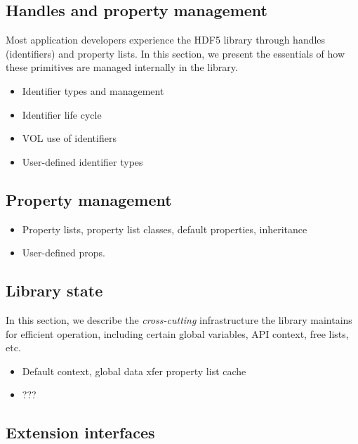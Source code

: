 \subsection{Handles and property management}\label{sec:handles}

Most application developers experience the HDF5 library through handles (identifiers) and property lists. In this section, we present the essentials of how these primitives are managed internally in the library.

\begin{itemize}
    \item Identifier types and management
    \item Identifier life cycle
    \item VOL use of identifiers
    \item User-defined identifier types
\end{itemize}

\subsection{Property management}\label{sec:properties}

\begin{itemize}
    \item Property lists, property list classes, default properties, inheritance
    \item User-defined props.
\end{itemize}


\subsection{Library state}\label{sec:lib-state}


In this section, we describe the \textit{cross-cutting} infrastructure the library maintains for efficient operation, including certain global variables, API context, free lists, etc.

\begin{itemize}
    \item Default context, global data xfer property list cache
    \item ???
\end{itemize}

\subsection{Extension interfaces}

